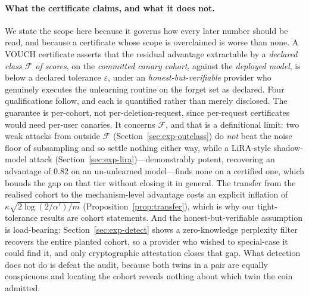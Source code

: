 \documentclass[pdflatex,sn-mathphys-num]{sn-jnl}
\theoremstyle{thmstyleone}
\theoremstyle{thmstyletwo}
\theoremstyle{thmstylethree}
\newcommand{\F}{\mathcal{F}}
\newcommand{\eps}{\varepsilon}
\begin{document}
\paragraph{What the certificate claims, and what it does not.} We state the scope here
because it governs how every later number should be read, and because a certificate
whose scope is overclaimed is worse than none. A VOUCH certificate asserts that the
residual advantage extractable by a \emph{declared class $\F$ of scores}, on the
\emph{committed canary cohort}, against the \emph{deployed model}, is below a declared
tolerance $\eps$, under an \emph{honest-but-verifiable} provider who genuinely executes
the unlearning routine on the forget set as declared. Four qualifications follow, and
each is quantified rather than merely disclosed. The guarantee is per-cohort, not
per-deletion-request, since per-request certificates would need per-user canaries. It
concerns $\F$, and that is a definitional limit: two weak attacks from outside $\F$
(Section~\ref{sec:exp-outclass}) do \emph{not} beat the noise floor of subsampling and
so settle nothing either way, while a LiRA-style shadow-model attack
(Section~\ref{sec:exp-lira})---demonstrably potent, recovering an advantage of $0.82$
on an un-unlearned model---finds none on a certified one, which bounds the gap on that
tier without closing it in general. The transfer from the realised
cohort to the mechanism-level advantage costs an explicit inflation of
$\kappa\sqrt{2\log(2/\alpha')/m}$ (Proposition~\ref{prop:transfer}), which is why our
tight-tolerance results are cohort statements. And the honest-but-verifiable assumption is load-bearing:
Section~\ref{sec:exp-detect} shows a zero-knowledge perplexity filter recovers the
entire planted cohort, so a provider who wished to special-case it could find it, and
only cryptographic attestation \citep{eisenhofer2025verifiable} closes that gap. What
detection does not do is defeat the audit, because both twins in a pair are equally
conspicuous and locating the cohort reveals nothing about which twin the coin admitted.
\end{document}
